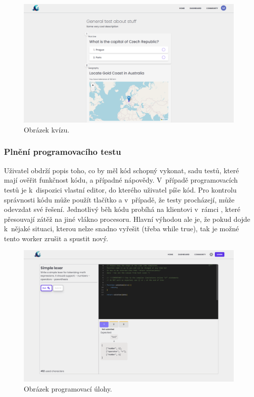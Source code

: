 \documentclass[12pt, a4paper,
openright
]{report}
\begin{document}
\begin{figure}[H]
	\centering %
	\includegraphics[width=0.75\linewidth]{image/test-taking.png} 
	\caption{Obrázek kvízu.} %
	\label{fig:test-taking} %
\end{figure}

\subsubsection{Plnění programovacího testu}
Uživatel obdrží popis toho, co by měl kód schopný vykonat, sadu testů, které mají ověřit funkčnost kódu, a případné nápovědy. V~případě programovacích testů je k~dispozici vlastní editor, do kterého uživatel píše kód. Pro kontrolu správnosti kódu může použít tlačítko \textit{} a v~případě, že testy procházejí, může odevzdat své řešení. Jednotlivý běh kódu probíhá na klientovi v~rámci , které přesouvají zátěž na jiné vlákno procesoru. Hlavní výhodou ale je, že pokud dojde k~nějaké situaci, kterou nelze snadno vyřešit (třeba while true), tak je možné tento worker zrušit a spustit nový.

\begin{figure}[H]
	\centering %
	\includegraphics[width=0.75\linewidth]{image/programming.png} 
	\caption{Obrázek programovací úlohy.} %
	\label{fig:programming} %
\end{figure}
\end{document}
